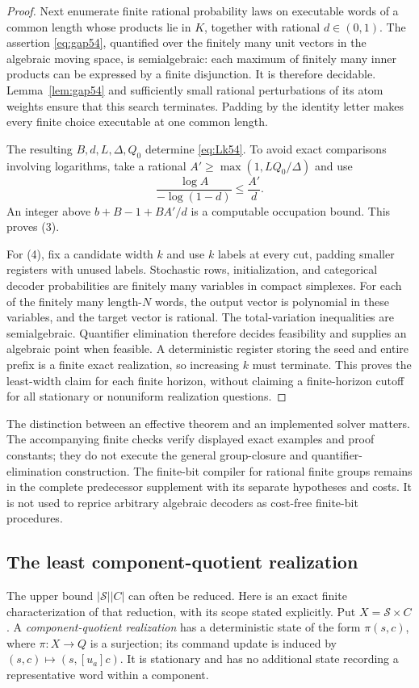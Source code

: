 \begin{proof}
Next enumerate finite rational probability laws on executable words of a common length whose products lie in $K$, together with rational $d\in(0,1)$. The assertion \eqref{eq:gap54}, quantified over the finitely many unit vectors in the algebraic moving space, is semialgebraic: each maximum of finitely many inner products can be expressed by a finite disjunction. It is therefore decidable. Lemma~\ref{lem:gap54} and sufficiently small rational perturbations of its atom weights ensure that this search terminates. Padding by the identity letter makes every finite choice executable at one common length.

The resulting $B,d,L,\Delta,Q_0$ determine \eqref{eq:Lk54}. To avoid exact comparisons involving logarithms, take a rational $A'\ge\max(1,LQ_0/\Delta)$ and use
\[
 \frac{\log A}{-\log(1-d)}\le\frac{A'}d.
\]
An integer above $b+B-1+BA'/d$ is a computable occupation bound. This proves (3).

For (4), fix a candidate width $k$ and use $k$ labels at every cut, padding smaller registers with unused labels. Stochastic rows, initialization, and categorical decoder probabilities are finitely many variables in compact simplexes. For each of the finitely many length-$N$ words, the output vector is polynomial in these variables, and the target vector is rational. The total-variation inequalities are semialgebraic. Quantifier elimination therefore decides feasibility and supplies an algebraic point when feasible. A deterministic register storing the seed and entire prefix is a finite exact realization, so increasing $k$ must terminate. This proves the least-width claim for each finite horizon, without claiming a finite-horizon cutoff for all stationary or nonuniform realization questions.
\end{proof}
The distinction between an effective theorem and an implemented solver matters. The accompanying finite checks verify displayed exact examples and proof constants; they do not execute the general group-closure and quantifier-elimination construction. The finite-bit compiler for rational finite groups remains in the complete predecessor supplement with its separate hypotheses and costs. It is not used to reprice arbitrary algebraic decoders as cost-free finite-bit procedures.

\subsection{The least component-quotient realization}
The upper bound $|\mathcal S||C|$ can often be reduced. Here is an exact finite characterization of that reduction, with its scope stated explicitly. Put $X=\mathcal S\times C$. A \emph{component-quotient realization} has a deterministic state of the form $\pi(s,c)$, where $\pi:X\to Q$ is a surjection; its command update is induced by $(s,c)\mapsto(s,[u_a]c)$. It is stationary and has no additional state recording a representative word within a component.

